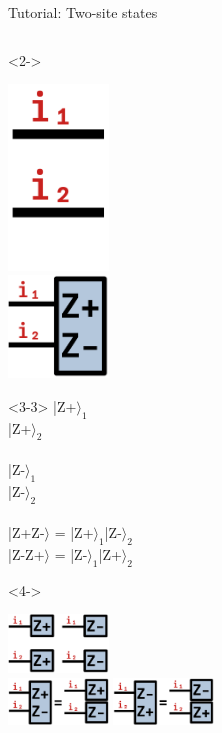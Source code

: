 \begin{frame}[fragile]{Tutorial: Two-site states}
\begin{columns}
\begin{column}{5cm}
\begin{onlyenv}<2->
\vspace*{0.0cm}
\begin{center}
\includegraphics[width=0.2\textwidth]{
  slides/assets/i1i2.png
} \\
\includegraphics[width=0.2\textwidth]{
  slides/assets/ZpZm12.png
}
\end{center}
\vspace*{0.0cm}
\end{onlyenv}

\begin{onlyenv}<3-3>
|Z+$\rangle_1$ \\
|Z+$\rangle_2$ \\
~\\
|Z-$\rangle_1$ \\
|Z-$\rangle_2$ \\
~\\
|Z+Z-$\rangle$ = |Z+$\rangle_1$|Z-$\rangle_2$ \\
|Z-Z+$\rangle$ = |Z-$\rangle_1$|Z+$\rangle_2$
\end{onlyenv}

\begin{onlyenv}<4->
\vspace*{0.0cm}
\begin{center}
\includegraphics[width=0.2\textwidth]{
  slides/assets/Zp1Zm1Zp2Zm2.png
} \\
\includegraphics[width=0.2\textwidth]{
  slides/assets/ZpZm12_eq_Zp1Zm2.png
}
\includegraphics[width=0.2\textwidth]{
  slides/assets/ZmZp12_eq_Zm1Zp2.png
}
\end{center}
\vspace*{0.0cm}
\end{onlyenv}


\end{column}
\end{columns}
\end{frame}
